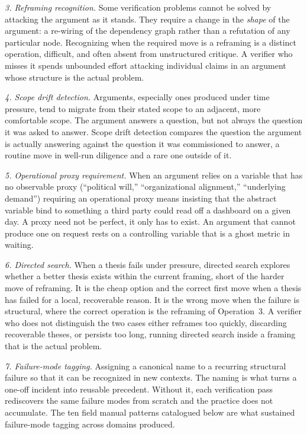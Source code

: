 \documentclass[
  11pt,
]{article}
\begin{document}
\emph{3. Reframing recognition.} Some verification problems
cannot be solved by attacking the argument as it stands. They require a
change in the \emph{shape} of the argument: a re-wiring of the dependency
graph rather than a refutation of any particular node. Recognizing when
the required move is a reframing is a distinct operation,
difficult, and often absent from unstructured critique. A verifier who
misses it spends unbounded effort
attacking individual claims in an argument whose structure is the actual
problem.

\emph{4. Scope drift detection.} Arguments, especially ones produced
under time pressure, tend to migrate from their stated scope
to an adjacent, more comfortable scope. The argument answers a question,
but not always the question it was asked to answer. Scope drift
detection compares the question the argument is actually answering
against the question it was commissioned to answer, a routine
move in well-run diligence and a rare one outside of it.

\emph{5. Operational proxy requirement.} When an argument relies on a
variable that has no observable proxy (``political will,''
``organizational alignment,'' ``underlying demand'') requiring an operational proxy means insisting that the abstract variable bind to something
a third party could read off a dashboard on a given day. A proxy need
not be perfect, it only has to exist.
An argument that cannot produce one on request rests on
a controlling variable that is a ghost metric in waiting.

\emph{6. Directed search.} When a thesis fails under pressure, directed search
explores whether a better thesis
exists within the current framing, short of the harder move of
reframing. It is the cheap option and the correct first
move when a thesis has failed for a local, recoverable reason. It is the
wrong move when the failure is structural, where the correct
operation is the reframing of Operation~3. A verifier who does
not distinguish the two cases either reframes too quickly,
discarding recoverable theses, or persists too long, running directed search inside a framing that is the actual problem.

\emph{7. Failure-mode tagging.} Assigning a canonical
name to a recurring structural failure so that it can be recognized in
new contexts. The naming is what turns a one-off incident into
reusable precedent. Without it, each verification
pass rediscovers the same failure modes from scratch and the practice
does not accumulate. The ten field manual patterns catalogued below
are what sustained failure-mode tagging across
domains produced.
\end{document}

